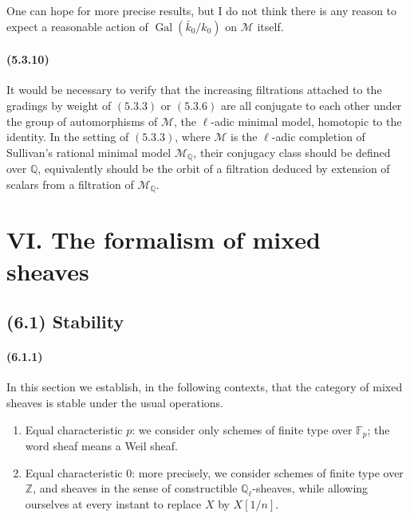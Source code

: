 \documentclass[11pt]{article}
\theoremstyle{remark}
\newcommand{\Ql}{\mathbb{Q}_\ell}
\newcommand{\ZZ}{\mathbb{Z}}
\newcommand{\QQ}{\mathbb{Q}}
\begin{document}
One can hope for more precise results, but I do not think there is any reason to expect a reasonable action of \(\operatorname{Gal}(\bar k_0/k_0)\) on \(\mathcal M\) itself.

\paragraph{(5.3.10)}
It would be necessary to verify that the increasing filtrations attached to the gradings by weight of \((5.3.3)\) or \((5.3.6)\) are all conjugate to each other under the group of automorphisms of \(\mathcal M\), the \(\ell\)-adic minimal model, homotopic to the identity.  In the setting of \((5.3.3)\), where \(\mathcal M\) is the \(\ell\)-adic completion of Sullivan's rational minimal model \(\mathcal M_{\QQ}\), their conjugacy class should be defined over \(\QQ\), equivalently should be the orbit of a filtration deduced by extension of scalars from a filtration of \(\mathcal M_{\QQ}\).



\section*{VI. The formalism of mixed sheaves}

\subsection*{(6.1) Stability}

\paragraph{(6.1.1)}
In this section we establish, in the following contexts, that the category of mixed sheaves is stable under the usual operations.

\begin{enumerate}[label=\alph*)]
\item Equal characteristic \(p\): we consider only schemes of finite type over \(\mathbb F_p\); the word sheaf means a Weil sheaf.
\item Equal characteristic \(0\): more precisely, we consider schemes of finite type over \(\ZZ\), and sheaves in the sense of constructible \(\Ql\)-sheaves, while allowing ourselves at every instant to replace \(X\) by \(X[1/n]\).
\end{enumerate}
\end{document}
